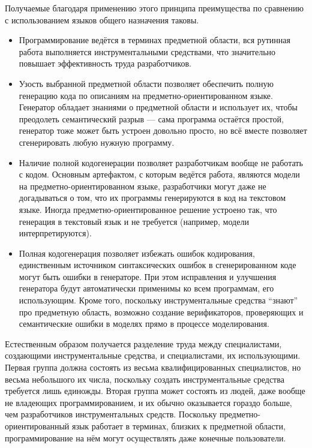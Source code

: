 Получаемые благодаря применению этого принципа преимущества по сравнению с 
использованием языков общего назначения таковы.
\begin{itemize}
	\item Программирование ведётся в терминах предметной области, вся рутинная 
		работа выполняется инструментальными средствами, что значительно повышает 
		эффективность труда разработчиков.
	\item Узость выбранной предметной области позволяет обеспечить полную 
		генерацию кода по описаниям на предметно-ориентированном языке. Генератор 
		обладает знаниями о предметной области и использует их, чтобы преодолеть 
		семантический разрыв --- сама программа остаётся простой, генератор тоже 
		может быть устроен довольно просто, но всё вместе позволяет сгенерировать 
		любую нужную программу.
	\item Наличие полной кодогенерации позволяет разработчикам вообще не работать 
		с кодом. Основным артефактом, с которым ведётся работа, являются модели на 
		предметно-ориентированном языке, разработчики могут даже не догадываться о 
		том, что их программы генерируются в код на текстовом языке. Иногда 
		предметно-ориентированное решение устроено так, что генерация в текстовый 
		язык и не требуется (например, модели интерпретируются).
	\item Полная кодогенерация позволяет избежать ошибок кодирования, единственным 
		источником синтаксических ошибок в сгенерированном коде могут быть ошибки в 
		генераторе. При этом исправления и улучшения генератора будут автоматически 
		применимы ко всем программам, его использующим. Кроме того, поскольку 
		инструментальные средства "`знают"' про предметную область, возможно 
		создание верификаторов, проверяющих и семантические ошибки в моделях прямо 
		в процессе моделирования.
\end{itemize}

Естественным образом получается разделение труда между специалистами, 
создающими инструментальные средства, и специалистами, их использующими. 
Первая группа должна состоять из весьма квалифицированных специалистов, но 
весьма небольшого их числа, поскольку создать инструментальные средства 
требуется лишь единожды. Вторая группа может состоять из людей, даже вообще не 
владеющих программированием, и их обычно оказывается гораздо больше, чем 
разработчиков инструментальных средств. Поскольку предметно-ориентированный язык 
работает в терминах, близких к предметной области, программирование на нём могут 
осуществлять даже конечные пользователи.

